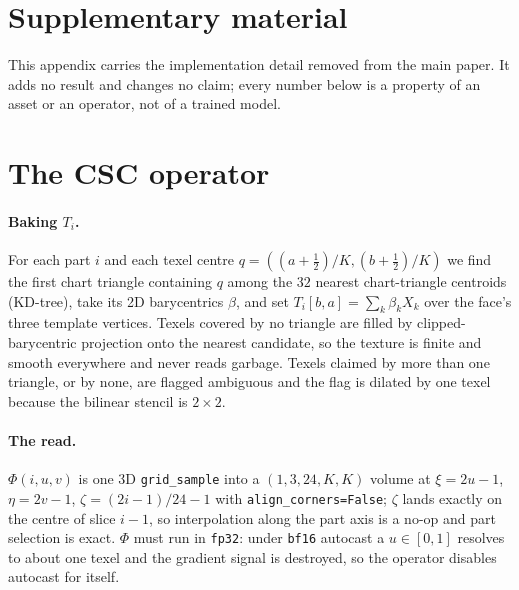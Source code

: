 \clearpage
\appendix
\setcounter{figure}{0}
\setcounter{table}{0}
\renewcommand{\thefigure}{S\arabic{figure}}
\renewcommand{\thetable}{S\arabic{table}}

\section*{Supplementary material}

This appendix carries the implementation detail removed from the main paper. It adds no result and
changes no claim; every number below is a property of an asset or an operator, not of a trained
model.

\section{The CSC operator}
\label{sup:csc}

\paragraph{Baking $T_i$.}
For each part $i$ and each texel centre $q=((a{+}\tfrac12)/K,(b{+}\tfrac12)/K)$ we find the first
chart triangle containing $q$ among the $32$ nearest chart-triangle centroids (KD-tree), take its
2D barycentrics $\beta$, and set $T_i[b,a]=\sum_k\beta_kX_k$ over the face's three template
vertices. Texels covered by no triangle are filled by clipped-barycentric projection onto the
nearest candidate, so the texture is finite and smooth everywhere and never reads garbage. Texels
claimed by more than one triangle, or by none, are flagged ambiguous and the flag is dilated by one
texel because the bilinear stencil is $2{\times}2$.

\paragraph{The read.}
$\Phi(i,u,v)$ is one 3D \texttt{grid\_sample} into a $(1,3,24,K,K)$ volume at
$\xi=2u-1$, $\eta=2v-1$, $\zeta=(2i-1)/24-1$ with \texttt{align\_corners=False}; $\zeta$ lands
exactly on the centre of slice $i{-}1$, so interpolation along the part axis is a no-op and part
selection is exact. $\Phi$ must run in \texttt{fp32}: under \texttt{bf16} autocast a $u\in[0,1]$
resolves to about one texel and the gradient signal is destroyed, so the operator disables autocast
for itself.

